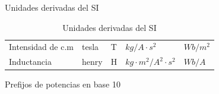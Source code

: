 \begin{frame}{Unidades derivadas del SI}
\begin{table}[]
{\begin{tabular}{@{}lllll@{}}
                Intensidad de c.m         & tesla           & T                & $\unit{kg/A \cdot s^2}$               & $\unit{Wb/m^2}$                       \\
                Inductancia               & henry           & H                & $\unit{kg \cdot m^2 / A^2 \cdot s^2}$ & $\unit{Wb/A}$                         \\
                \bottomrule
            \end{tabular}%
        }
        \label{tab:unidades_derivadas_si}
        \caption{Unidades derivadas del SI}
    \end{table}
\end{frame}


\begin{frame}{Prefijos de potencias en base 10}
    \begin{table}
        \centering
\end{table}
\end{frame}
